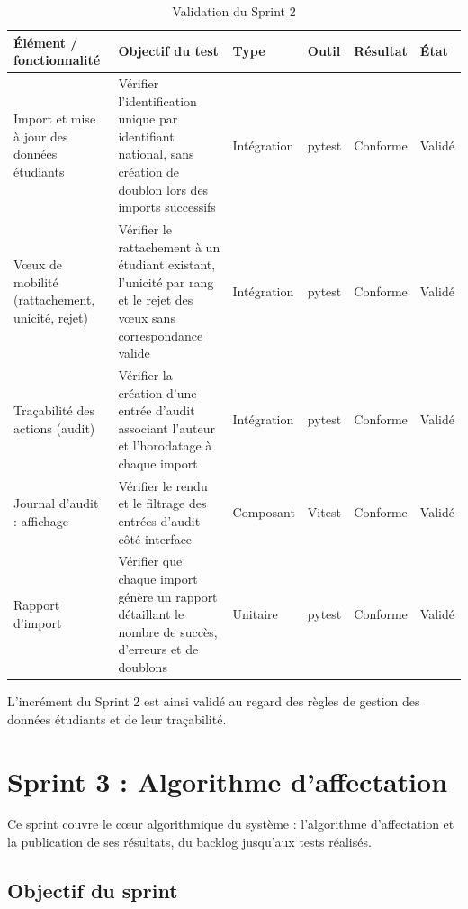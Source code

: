 \renewcommand{\arraystretch}{1.3}
\begin{table}[H]
\centering
\caption{Validation du Sprint 2}
\label{tab:validation-sprint2}
\footnotesize
\begin{tabular}{|p{2.8cm}|p{4.6cm}|p{1.5cm}|p{1.4cm}|p{1.8cm}|p{1.4cm}|}
\hline
\rowcolor{gray!20}
\textbf{Élément / fonctionnalité} & \textbf{Objectif du test} & \textbf{Type} & \textbf{Outil} & \textbf{Résultat} & \textbf{État} \\
\hline
Import et mise à jour des données étudiants &
Vérifier l'identification unique par identifiant national, sans création de doublon lors des imports successifs &
Intégration & pytest & Conforme & Validé \\
\hline
Vœux de mobilité (rattachement, unicité, rejet) &
Vérifier le rattachement à un étudiant existant, l'unicité par rang et le rejet des vœux sans correspondance valide &
Intégration & pytest & Conforme & Validé \\
\hline
Traçabilité des actions (audit) &
Vérifier la création d'une entrée d'audit associant l'auteur et l'horodatage à chaque import &
Intégration & pytest & Conforme & Validé \\
\hline
Journal d'audit : affichage &
Vérifier le rendu et le filtrage des entrées d'audit côté interface &
Composant & Vitest & Conforme & Validé \\
\hline
Rapport d'import &
Vérifier que chaque import génère un rapport détaillant le nombre de succès, d'erreurs et de doublons &
Unitaire & pytest & Conforme & Validé \\
\hline
\end{tabular}
\end{table}

L'incrément du Sprint 2 est ainsi validé au regard des règles de gestion des données étudiants et de leur traçabilité.


\section{Sprint 3 : Algorithme d'affectation}

Ce sprint couvre le cœur algorithmique du système : l'algorithme d'affectation et la publication de ses résultats, du backlog jusqu'aux tests réalisés.

\subsection{Objectif du sprint}

